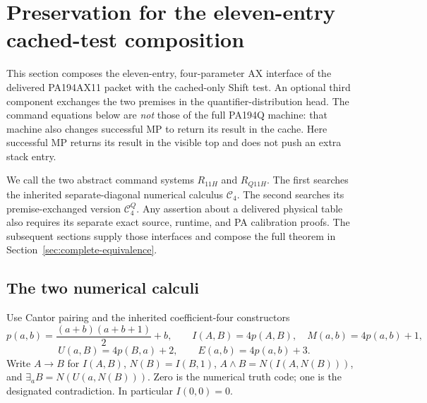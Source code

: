 \section{Preservation for the eleven-entry cached-test composition}
\label{sec:ax11h-preservation}

This section composes the eleven-entry, four-parameter AX interface of
the delivered PA194AX11 packet with the cached-only Shift test. An optional
third component exchanges the two premises in the quantifier-distribution
head. The command equations below are \emph{not} those of the full PA194Q
machine: that machine also changes successful MP to return its result in
the cache. Here successful MP returns its result in the visible top and
does not push an extra stack entry.

We call the two abstract command systems $R_{11H}$ and $R_{Q11H}$.
The first searches the inherited separate-diagonal numerical calculus
$\mathcal C_4$. The second searches its premise-exchanged version
$\mathcal C_4^Q$. Any assertion about a delivered physical table also
requires its separate exact source, runtime, and PA calibration proofs.
The subsequent sections supply those interfaces and compose the full
theorem in Section~\ref{sec:complete-equivalence}.

\subsection{The two numerical calculi}

Use Cantor pairing and the inherited coefficient-four constructors
\[
 p(a,b)=\frac{(a+b)(a+b+1)}2+b,\qquad
 I(A,B)=4p(A,B),\quad M(a,b)=4p(a,b)+1,
\]
\[
 U(a,B)=4p(B,a)+2,\qquad E(a,b)=4p(a,b)+3.
\]
Write $A\to B$ for $I(A,B)$, $N(B)=I(B,1)$,
$A\wedge B=N(I(A,N(B)))$, and
$\exists_a B=N(U(a,N(B)))$. Zero is the numerical truth code;
one is the designated contradiction. In particular $I(0,0)=0$.

